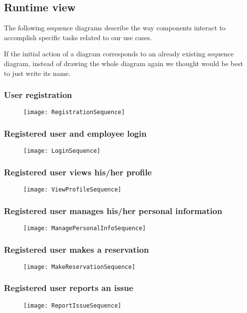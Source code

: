 \subsection{Runtime  view}  
The following sequence diagrams describe the way components interact to accomplish specific tasks related to our use cases.

If the initial action of a diagram corresponds to an already existing sequence diagram, instead of drawing the whole diagram again we thought would be best to just write its name.
\subsubsection{User registration}
 \begin{figure}[H]
 	\centering
 	\texttt{[image: RegistrationSequence]}
 \end{figure}
\subsubsection{Registered user and employee login}
\begin{figure}[H]
	\centering
	\texttt{[image: LoginSequence]}
\end{figure}
\subsubsection{Registered user views his/her profile}
\begin{figure}[H]
	\centering
	\texttt{[image: ViewProfileSequence]}
\end{figure}
\subsubsection{Registered user manages his/her personal information}
\begin{figure}[H]
	\centering
	\texttt{[image: ManagePersonalInfoSequence]}
\end{figure}
\subsubsection{Registered user makes a reservation}
\begin{figure}[H]
	\centering
	\texttt{[image: MakeReservationSequence]}
\end{figure}
\subsubsection{Registered user reports an issue}
\begin{figure}[H]
	\centering
	\texttt{[image: ReportIssueSequence]}
\end{figure}
